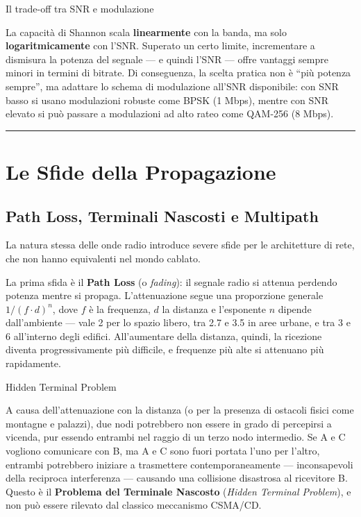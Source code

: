 \documentclass[
  italian,
  openany]{book}
\begin{document}
\begin{callouttip}{Il trade-off tra SNR e modulazione}

La capacità di Shannon scala \textbf{linearmente} con la banda, ma solo
\textbf{logaritmicamente} con l'SNR. Superato un certo limite,
incrementare a dismisura la potenza del segnale --- e quindi l'SNR ---
offre vantaggi sempre minori in termini di bitrate. Di conseguenza, la
scelta pratica non è ``più potenza sempre'', ma adattare lo schema di
modulazione all'SNR disponibile: con SNR basso si usano modulazioni
robuste come BPSK (1 Mbps), mentre con SNR elevato si può passare a
modulazioni ad alto rateo come QAM-256 (8 Mbps).

\end{callouttip}

\begin{center}\rule{0.5\linewidth}{0.5pt}\end{center}

\section{Le Sfide della Propagazione}\label{le-sfide-della-propagazione}

\subsection{Path Loss, Terminali Nascosti e
Multipath}\label{path-loss-terminali-nascosti-e-multipath}

La natura stessa delle onde radio introduce severe sfide per le
architetture di rete, che non hanno equivalenti nel mondo cablato.

La prima sfida è il \textbf{Path Loss} (o \emph{fading}): il segnale
radio si attenua perdendo potenza mentre si propaga. L'attenuazione
segue una proporzione generale \(1/(f \cdot d)^n\), dove \(f\) è la
frequenza, \(d\) la distanza e l'esponente \(n\) dipende dall'ambiente
--- vale 2 per lo spazio libero, tra 2.7 e 3.5 in aree urbane, e tra 3 e
6 all'interno degli edifici. All'aumentare della distanza, quindi, la
ricezione diventa progressivamente più difficile, e frequenze più alte
si attenuano più rapidamente.

\begin{calloutwarning}{Hidden Terminal Problem}

A causa dell'attenuazione con la distanza (o per la presenza di ostacoli
fisici come montagne e palazzi), due nodi potrebbero non essere in grado
di percepirsi a vicenda, pur essendo entrambi nel raggio di un terzo
nodo intermedio. Se A e C vogliono comunicare con B, ma A e C sono fuori
portata l'uno per l'altro, entrambi potrebbero iniziare a trasmettere
contemporaneamente --- inconsapevoli della reciproca interferenza ---
causando una collisione disastrosa al ricevitore B. Questo è il
\textbf{Problema del Terminale Nascosto} (\emph{Hidden Terminal
Problem}), e non può essere rilevato dal classico meccanismo CSMA/CD.

\end{calloutwarning}
\end{document}
